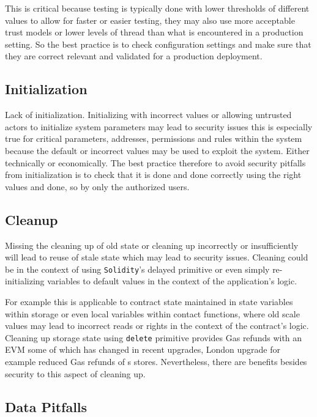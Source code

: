 This is critical because testing is typically done with lower thresholds
of different values to allow for faster or easier testing, they may also
use more acceptable trust models or lower levels of thread than what is
encountered in a production setting. So the best practice is to check
configuration settings and make sure that they are correct relevant and
validated for a production deployment.

\subsection{Initialization}\label{initialization}

Lack of initialization. Initializing with incorrect values or allowing
untrusted actors to initialize system parameters may lead to security
issues this is especially true for critical parameters, addresses,
permissions and rules within the system because the default or incorrect
values may be used to exploit the system. Either technically or
economically. The best practice therefore to avoid security pitfalls
from initialization is to check that it is done and done correctly using
the right values and done, so by only the authorized users.

\subsection{Cleanup}\label{cleanup}

Missing the cleaning up of old state or cleaning up incorrectly or
insufficiently will lead to reuse of stale state which may lead to
security issues. Cleaning could be in the context of using
\texttt{Solidity}'s delayed primitive or even simply re-initializing
variables to default values in the context of the application's logic.

For example this is applicable to contract state maintained in state
variables within storage or even local variables within contact
functions, where old scale values may lead to incorrect reads or rights
in the context of the contract's logic. Cleaning up storage state using
\texttt{delete} primitive provides Gas refunds with an EVM some of which
has changed in recent upgrades, London upgrade for example reduced Gas
refunds of s stores. Nevertheless, there are benefits besides security
to this aspect of cleaning up.

\subsection{Data Pitfalls}\label{data-pitfalls}

